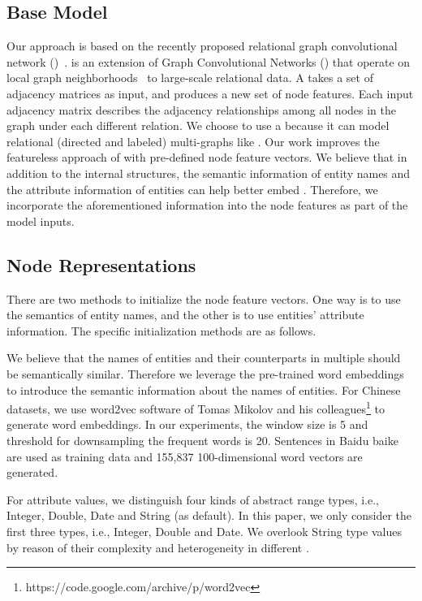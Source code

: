     \subsection{Base Model}
    Our approach is based on the recently proposed relational graph convolutional network (\RGCN)~\cite{Schlichtkrull2017Modeling}. 
    \RGCN is an extension of Graph Convolutional Networks (\GCNs) that operate on local graph neighborhoods~\cite{Duvenaud2015Convolutional,Kipf2016Semi} to large-scale relational data. 
    A \RGCN takes a set of adjacency matrices as input, and produces a new set of node features. 
    Each input adjacency matrix describes the adjacency relationships among all nodes in the graph under each different relation. 
    We choose to use a \RGCN because it can model relational (directed and labeled) multi-graphs like \KGs. 
    Our work improves the featureless approach of \RGCN with pre-defined node feature vectors. 
    We believe that in addition to the internal structures, the semantic information of entity names and the attribute information of entities can help \RGCN better embed \KGs. 
    Therefore, we incorporate the aforementioned information into the node features as part of the model inputs.


	\subsection{Node Representations}
	\label{subsection:Node Representations}
	There are two methods to initialize the node feature vectors. 
	One way is to use the semantics of entity names, and the other is to use entities' attribute information. The specific initialization methods are as follows. 
	
	\label{wordvector}
	We believe that the names of entities and their counterparts in multiple \KGs should be semantically similar. Therefore we leverage the pre-trained word embeddings to introduce the semantic information about the names of entities.
	For Chinese datasets, we use word2vec software of Tomas Mikolov and his colleagues\footnote{https://code.google.com/archive/p/word2vec} to generate word embeddings. In our experiments, the window size is 5 and threshold for downsampling the frequent words is 20. Sentences in Baidu baike are used as training data and 155,837 100-dimensional word vectors are generated.
	
	For attribute values, we distinguish four kinds of abstract range types, i.e., Integer, Double, Date and String (as default). 
	In this paper, we only consider the first three types, i.e., Integer, Double and Date. 
	We overlook String type values by reason of their complexity and heterogeneity in different \KGs.
	
